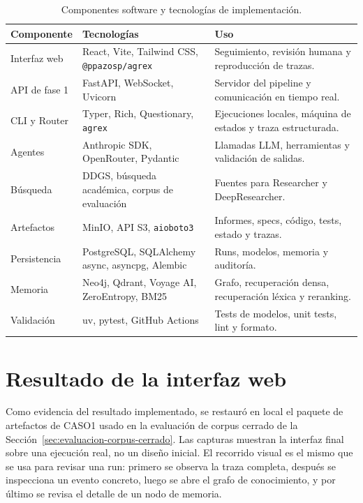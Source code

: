 \begin{table}[H]
\begin{center}
\scriptsize
\begin{tabular}{|p{2.7cm}|p{4.6cm}|p{5.1cm}|} \hline
\textbf{Componente} & \textbf{Tecnologías} & \textbf{Uso} \\ \hline
Interfaz web & React, Vite, Tailwind CSS, \texttt{@ppazosp/agrex} & Seguimiento, revisión humana y reproducción de trazas. \\ \hline
API de fase 1 & FastAPI, WebSocket, Uvicorn & Servidor del pipeline y comunicación en tiempo real. \\ \hline
CLI y Router & Typer, Rich, Questionary, \texttt{agrex} & Ejecuciones locales, máquina de estados y traza estructurada. \\ \hline
Agentes & Anthropic SDK, OpenRouter, Pydantic & Llamadas LLM, herramientas y validación de salidas. \\ \hline
Búsqueda & DDGS, búsqueda académica, corpus de evaluación & Fuentes para Researcher y DeepResearcher. \\ \hline
Artefactos & MinIO, API S3, \texttt{aioboto3} & Informes, specs, código, tests, estado y trazas. \\ \hline
Persistencia & PostgreSQL, SQLAlchemy async, asyncpg, Alembic & Runs, modelos, memoria y auditoría. \\ \hline
Memoria & Neo4j, Qdrant, Voyage AI, ZeroEntropy, BM25 & Grafo, recuperación densa, recuperación léxica y reranking. \\ \hline
Validación & uv, pytest, GitHub Actions & Tests de modelos, unit tests, lint y formato. \\ \hline
\end{tabular}
\caption{Componentes software y tecnologías de implementación.}
\label{tab:componentes-tecnologias}
\end{center}
\end{table}

\section{Resultado de la interfaz web}

Como evidencia del resultado implementado, se restauró en local el paquete de
artefactos de CASO1 usado en la evaluación de corpus cerrado de la
Sección~\ref{sec:evaluacion-corpus-cerrado}. Las capturas muestran la interfaz
final sobre una ejecución real, no un diseño inicial. El recorrido visual es el
mismo que se usa para revisar una run: primero se observa la traza completa,
después se inspecciona un evento concreto, luego se abre el grafo de
conocimiento, y por último se revisa el detalle de un nodo de memoria.

